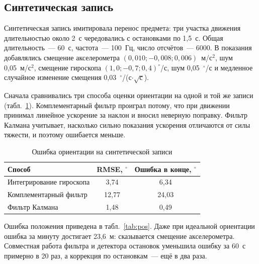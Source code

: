 \documentclass{misisarticle}
\begin{document}
\subsection{Синтетическая запись}

Синтетическая запись имитировала перенос предмета: три участка движения длительностью около 2~с чередовались с остановками по 1,5~с. Общая длительность~--- 60~с, частота~--- 100~Гц, число отсчётов~--- 6000. В показания добавлялись смещение акселерометра $(0{,}010;-0{,}008;0{,}006)$~м/с$^2$, шум 0,05~м/с$^2$, смещение гироскопа $(1{,}0;-0{,}7;0{,}4)^\circ$/с, шум 0,05~$^\circ$/с и медленное случайное изменение смещения 0,03~$^\circ$/(с$\cdot\sqrt{\text{с}}$).

Сначала сравнивались три способа оценки ориентации на одной и той же записи (табл.~\ref{tab:orient}). Комплементарный фильтр проиграл потому, что при движении принимал линейное ускорение за наклон и вносил неверную поправку. Фильтр Калмана учитывает, насколько сильно показания ускорения отличаются от силы тяжести, и поэтому ошибается меньше.

\begin{table}[H]
  \caption{Ошибка ориентации на синтетической записи}
  \label{tab:orient}
  \centering
  \footnotesize
  \begin{tabular}{lcc}
    \toprule
    Способ & RMSE, $^\circ$ & Ошибка в конце, $^\circ$ \\
    \midrule
    Интегрирование гироскопа & 3,74 & 6,34 \\
    Комплементарный фильтр & 12,77 & 24,03 \\
    Фильтр Калмана & 1,48 & 0,49 \\
    \bottomrule
  \end{tabular}
\end{table}

Ошибка положения приведена в табл.~\ref{tab:pos}. Даже при идеальной ориентации ошибка за минуту достигает 23,6~м: сказывается смещение акселерометра. Совместная работа фильтра и детектора остановок уменьшила ошибку за 60~с примерно в 20 раз, а коррекция по остановкам~--- ещё в два раза.
\end{document}
